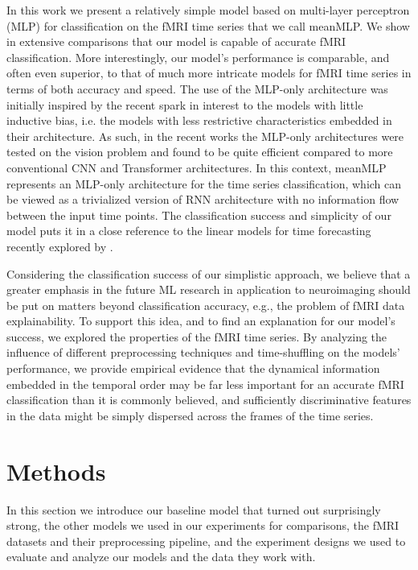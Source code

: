 \documentclass[final,5p,times,twocolumn,authoryear]{elsarticle}
\begin{document}
In this work we present a relatively simple model based on multi-layer perceptron (MLP) for classification on the fMRI time series that we call meanMLP. We show in extensive comparisons that our model is capable of accurate fMRI classification. More interestingly, our model’s performance is comparable, and often even superior, to that of much more intricate models for fMRI time series in terms of both accuracy and speed. 
The use of the MLP-only architecture was initially inspired by the recent spark in interest to the models with little inductive bias, i.e. the models with less restrictive characteristics embedded in their architecture. As such, in the recent works the MLP-only architectures were tested on the vision problem \citep{mlp_mixer, scaling_mlp} and found to be quite efficient compared to more conventional CNN and Transformer architectures. In this context, meanMLP represents an MLP-only architecture for the time series classification, which can be viewed as a trivialized version of RNN architecture with no information flow between the input time points. The classification success and simplicity of our model puts it in a close reference to the linear models for time forecasting recently explored by \citet{linear_forecasting}.

Considering the classification success of our simplistic approach, we believe that a greater emphasis in the future ML research in application to neuroimaging should be put on matters beyond classification accuracy, e.g., the problem of fMRI data explainability. To support this idea, and to find an explanation for our model’s success, we explored the properties of the fMRI time series. By analyzing the influence of different preprocessing techniques and time-shuffling on the models’ performance, we provide empirical evidence that the dynamical information embedded in the temporal order may be far less important for an accurate fMRI classification than it is commonly believed, and sufficiently discriminative features in the data might be simply dispersed across the frames of the time series. 


\section{Methods}
In this section we introduce our baseline model that turned out surprisingly strong, the other models we used in our experiments for comparisons, the fMRI datasets and their preprocessing pipeline, and the experiment designs we used to evaluate and analyze our models and the data they work with.
\end{document}
